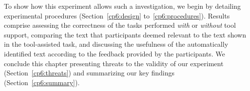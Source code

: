 

To show how this experiment allows such a investigation, we begin by detailing
experimental procedures (Section~\ref{cp6:design} to~\ref{cp6:procedures}).
Results comprise assessing the correctness of the tasks performed \textit{with} or \textit{without} tool support, comparing  the text that participants deemed relevant to the text 
shown in the tool-assisted task, and discussing the usefulness of the automatically identified text according to the feedback provided by the participants.
We conclude this chapter presenting threats to the validity of our experiment (Section~\ref{cp6:threats}) and 
 summarizing our key findings (Section~\ref{cp6:summary}).




 
 
 
 
 
 
 
 
 
 


































